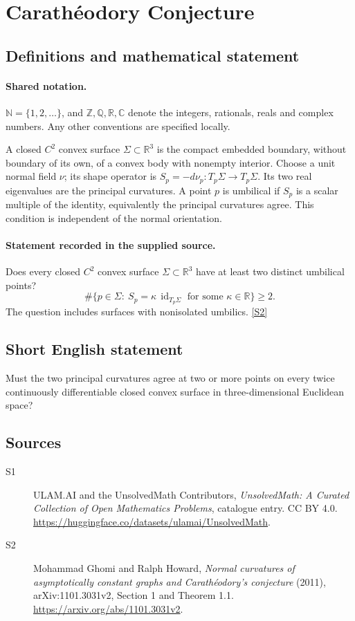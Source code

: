 \documentclass[11pt]{article}
\newcommand{\sref}[2]{\hyperlink{source:#1:#2}{[S#2]}}
\begin{document}
\section{Carathéodory Conjecture}\label{statement}

\subsection{Definitions and mathematical statement}

\paragraph{Shared notation.}$\mathbb N=\{1,2,\ldots\}$, and $\mathbb Z,\mathbb Q,\mathbb R,\mathbb C$ denote the integers, rationals, reals and complex numbers. Any other conventions are specified locally.


A closed $C^2$ convex surface $\Sigma\subset\mathbb R^3$ is the compact embedded boundary, without boundary of its own, of a convex body with nonempty interior. Choose a unit normal field $\nu$; its shape operator is $S_p=-d\nu_p:T_p\Sigma\to T_p\Sigma$. Its two real eigenvalues are the principal curvatures. A point $p$ is umbilical if $S_p$ is a scalar multiple of the identity, equivalently the principal curvatures agree. This condition is independent of the normal orientation.
\paragraph{Statement recorded in the supplied source.}
Does every closed $C^2$ convex surface $\Sigma\subset\mathbb R^3$ have at least two distinct umbilical points?
\[
 \#\{p\in\Sigma:\ S_p=\kappa\,\operatorname{id}_{T_p\Sigma}\text{ for some }\kappa\in\mathbb R\}\ge2.
\]
The question includes surfaces with nonisolated umbilics. \sref{statement}{2}
\subsection{Short English statement}
Must the two principal curvatures agree at two or more points on every twice continuously differentiable closed convex surface in three-dimensional Euclidean space?
\subsection{Sources}
\begin{description}
\item[\hypertarget{source:statement:1}{S1}] ULAM.AI and the UnsolvedMath Contributors, \emph{UnsolvedMath: A Curated Collection of Open Mathematics Problems}, catalogue entry. CC BY 4.0. \url{https://huggingface.co/datasets/ulamai/UnsolvedMath}.
\item[\hypertarget{source:statement:2}{S2}] Mohammad Ghomi and Ralph Howard, \emph{Normal curvatures of asymptotically constant graphs and Carathéodory's conjecture} (2011), arXiv:1101.3031v2, Section 1 and Theorem 1.1. \url{https://arxiv.org/abs/1101.3031v2}.
\end{description}
\label{end:statement}
\end{document}
